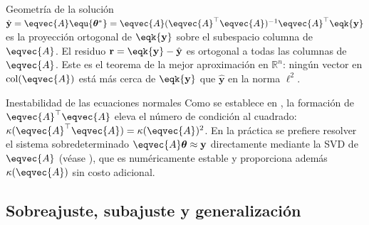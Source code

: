 \begin{observacion}{Geometría de la solución}
$\hat{\mathbf{y}} = \eqvec{A}\equ{\boldsymbol{\theta}^*} =
\eqvec{A}(\eqvec{A}^\top\eqvec{A})^{-1}\eqvec{A}^\top\eqk{\mathbf{y}}$
es la proyección ortogonal de $\eqk{\mathbf{y}}$ sobre el subespacio columna
de $\eqvec{A}$. El residuo $\mathbf{r} = \eqk{\mathbf{y}} - \hat{\mathbf{y}}$
es ortogonal a todas las columnas de $\eqvec{A}$. Este es el teorema de la
mejor aproximación en $\mathbb{R}^n$: ningún vector en $\mathrm{col}(\eqvec{A})$
está más cerca de $\eqk{\mathbf{y}}$ que $\hat{\mathbf{y}}$ en la norma $\ell^2$.
\end{observacion}

\begin{observacion}{Inestabilidad de las ecuaciones normales}
Como se establece en , la formación de
$\eqvec{A}^\top\eqvec{A}$ eleva el número de condición al cuadrado:
$\kappa(\eqvec{A}^\top\eqvec{A}) = \kappa(\eqvec{A})^2$. En la práctica
se prefiere resolver el sistema sobredeterminado $\eqvec{A}\boldsymbol{\theta}
\approx \mathbf{y}$ directamente mediante la SVD de $\eqvec{A}$
(véase ), que es numéricamente estable y proporciona
además $\kappa(\eqvec{A})$ sin costo adicional.
\end{observacion}



\subsection*{Sobreajuste, subajuste y generalización}
\label{sec:generalizacion}

